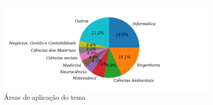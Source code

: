 \begin{figure}[!htb]
	\centering
	\caption{Áreas de aplicação do tema}
	\label{fig:areas}
	\includegraphics[width=0.9\linewidth]{Revisao/Figuras/areas}
	
	
\end{figure}
